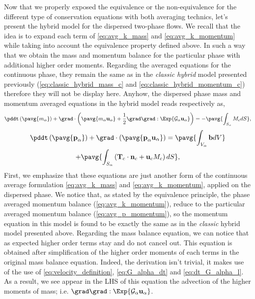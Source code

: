 Now that we properly exposed the equivalence or the non-equivalence for the different type of conservation equations with both averaging technics, let's present the hybrid model for the dispersed two-phase flows. 
We recall that the idea is to expand each term of \ref{eq:avg_k_mass} and \ref{eq:avg_k_momentum} while taking into account the equivalence property defined above.
In such a way that we obtain the mass and momentum balance for the particular phase with additional higher order moments. 
Regarding the averaged equations for the continuous phase, they remain the same as in the \textit{classic hybrid} model presented previously (\ref{eq:classic_hybrid_mass_c} and \ref{eq:classic_hybrid_momentum_c}) therefore they will not be display here.
Anyhow, the dispersed phase mass and momentum averaged equations in the hybrid model reads respectively as, 
\begin{equation}
    \pddt   \left(\pavg{m_\alpha}\right)
    + \grad \cdot \left(\pavg{m_\alpha \textbf{u}_\alpha} 
    + \frac{1}{2}\grad\grad : \Exp{ \mathcal{G}_\alpha\textbf{u}_\alpha}\right) 
    = -\pavg{\int_{S_\alpha} M_c d S},
        \label{eq:hybrid_mass_p}
\end{equation}
\begin{multline}
    \pddt   \left(\pavg{\textbf{p}_\alpha}\right)
    + \grad \cdot (\pavg{\textbf{p}_\alpha \textbf{u}_\alpha})
    = \pavg{\int_{V_\alpha} \textbf{b} dV}\\
    + \pavg{\int_{S_\alpha} \left(\textbf{T}_c  \cdot \textbf{n}_c  + \textbf{u}_c M_c \right) dS},
    \label{eq:hybrid_momentum_p}
\end{multline}
First, we emphasize that these equations are just another form of the continuous average formulation \ref{eq:avg_k_mass} and \ref{eq:avg_k_momentum}, applied on the dispersed phase. 
We notice that, as stated by the equivalence principle, the phase averaged momentum balance (\ref{eq:avg_k_momentum}), reduce to the particular averaged momentum balance (\ref{eq:avg_p_momentum}), so the momentum equation in this model is found to be exactly the same as in the \textit{classic} hybrid model presented above. 
Regarding the mass balance equation, we can notice that as expected higher order terms stay and do not cancel out.
This equation is obtained after simplification of the higher order moments of each terms in the original mass balance equation. 
Indeed, the derivation isn't trivial, it makes use of the use of \ref{eq:velocity_definition}, \ref{eq:G_alpha_dt} and \ref{eq:dt_G_alpha_l}.
As a result, we see appear in the LHS of this equation the advection of the higher moments of mass; i.e. $\grad \grad : \Exp{ \mathcal{G}_\alpha\textbf{u}_\alpha}$. 
